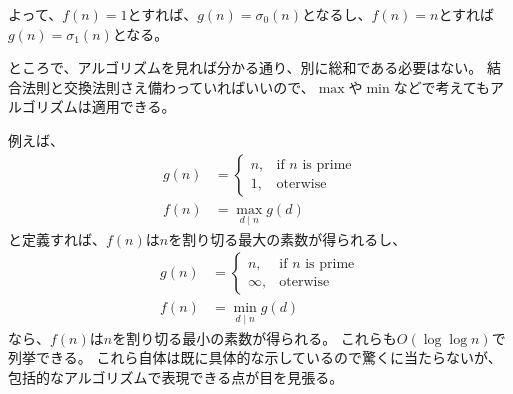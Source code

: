 よって、$f(n)=1$とすれば、$g(n)=\sigma_0(n)$となるし、$f(n)=n$とすれば$g(n)=\sigma_1(n)$となる。

ところで、アルゴリズムを見れば分かる通り、別に総和である必要はない。
結合法則と交換法則さえ備わっていればいいので、$\max$や$\min$などで考えてもアルゴリズムは適用できる。

例えば、
\begin{align*}
g(n) &=
\begin{cases}
n, &\mbox{if } n \mbox{ is prime}\\
1, &\mbox{oterwise}
\end{cases}
\\
f(n) &= \max_{d \mid n}g(d)
\end{align*}
と定義すれば、$f(n)$は$n$を割り切る最大の素数が得られるし、
\begin{align*}
g(n) &=
\begin{cases}
n, &\mbox{if } n \mbox{ is prime}\\
\infty, &\mbox{oterwise}
\end{cases}
\\
f(n) &= \min_{d \mid n}g(d)
\end{align*}
なら、$f(n)$は$n$を割り切る最小の素数が得られる。
これらも$O(\log{\log{n}})$で列挙できる。
これら自体は既に具体的な示しているので驚くに当たらないが、包括的なアルゴリズムで表現できる点が目を見張る。


